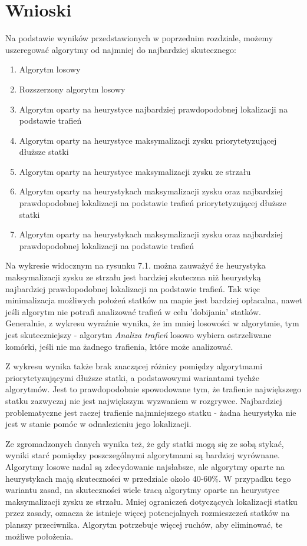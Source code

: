 \newpage %
\section{Wnioski}

Na podstawie wyników przedstawionych w poprzednim rozdziale, możemy uszeregować algorytmy od najmniej do najbardziej skutecznego:\begin{enumerate}
    \item Algorytm losowy
    \item Rozszerzony algorytm losowy
    \item Algorytm oparty na heurystyce najbardziej prawdopodobnej lokalizacji na podstawie trafień
    \item Algorytm oparty na heurystyce maksymalizacji zysku priorytetyzującej dłuższe statki
    \item Algorytm oparty na heurystyce maksymalizacji zysku ze strzału
        \item Algorytm oparty na heurystykach maksymalizacji zysku oraz najbardziej prawdopodobnej lokalizacji na podstawie trafień priorytetyzującej dłuższe statki
    \item Algorytm oparty na heurystykach maksymalizacji zysku oraz najbardziej prawdopodobnej lokalizacji na podstawie trafień
\end{enumerate}

Na wykresie widocznym na rysunku 7.1. można zauważyć że heurystyka maksymalizacji zysku ze strzału jest bardziej skuteczna niż heurystyką najbardziej prawdopodobnej lokalizacji na podstawie trafień. Tak więc minimalizacja możliwych położeń statków na mapie jest bardziej opłacalna, nawet jeśli algorytm nie potrafi analizować trafień w celu 'dobijania' statków. Generalnie, z wykresu wyraźnie wynika, że im mniej losowości w algorytmie, tym jest skuteczniejszy - algorytm \emph{Analiza trafień} losowo wybiera ostrzeliwane komórki, jeśli nie ma żadnego trafienia, które może analizować.

Z wykresu wynika także brak znaczącej różnicy pomiędzy algorytmami priorytetyzującymi dłuższe statki, a podstawowymi wariantami tychże algorytmów. Jest to prawdopodobnie spowodowane tym, że trafienie największego statku zazwyczaj nie jest największym wyzwaniem w rozgrywce. Najbardziej problematyczne jest raczej trafienie najmniejszego statku - żadna heurystyka nie jest w stanie pomóc w odnalezieniu jego lokalizacji.

Ze zgromadzonych danych wynika też, że gdy statki mogą się ze sobą stykać, wyniki starć pomiędzy poszczególnymi algorytmami są bardziej wyrównane. Algorytmy losowe nadal są zdecydowanie najsłabsze, ale algorytmy oparte na heurystykach mają skuteczności w przedziale około 40-60\%. W przypadku tego wariantu zasad, na skuteczności wiele tracą algorytmy oparte na heurystyce maksymalizacji zysku ze strzału. Mniej ograniczeń dotyczących lokalizacji statku przez zasady, oznacza że istnieje więcej potencjalnych rozmieszczeń statków na planszy przeciwnika. Algorytm potrzebuje więcej ruchów, aby eliminować, te możliwe położenia. 

